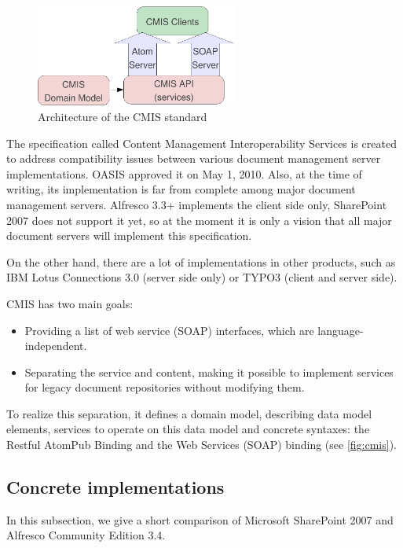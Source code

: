 \begin{figure}[H]
\centering
\includegraphics[width=250px,keepaspectratio]{cmis.pdf}
\caption{Architecture of the CMIS standard}
\label{fig:cmis}
\end{figure}

The specification called Content Management Interoperability
Services \cite{cmis} is created to address compatibility issues between various
document management server implementations. OASIS approved it on May 1, 2010.
Also, at the time of writing, its implementation is far from complete among major
document management servers. Alfresco 3.3+ implements the client side only,
SharePoint 2007 does not support it yet, so at the moment it is only a vision that
all major document servers will implement this specification.

On the other hand, there are a lot of implementations in other products, such
as IBM Lotus Connections 3.0 \cite{lotus} (server side only) or TYPO3 (client
and server side).

CMIS has two main goals:

\begin{itemize}
\item Providing a list of web service (SOAP) interfaces, which are language-independent.
\item Separating the service and content, making it possible to
implement services for legacy document repositories without modifying them.
\end{itemize}

To realize this separation, it defines a domain model, describing data
model elements, services to operate on this data model and concrete syntaxes:
the Restful AtomPub Binding and the Web Services (SOAP) binding (see
\autoref{fig:cmis}).

\subsection{Concrete implementations}

In this subsection, we give a short comparison of Microsoft SharePoint 2007 and
Alfresco Community Edition 3.4.

